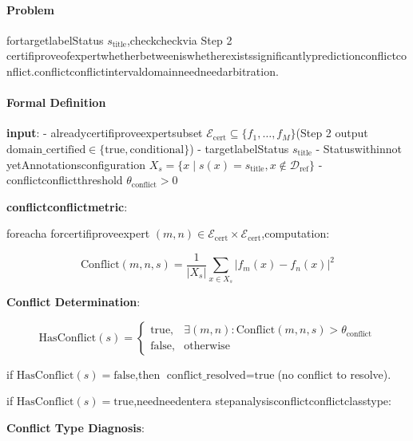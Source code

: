 \documentclass[
  12pt,
]{article}
\begin{document}
\paragraph{Problem}\label{ux95eeux9898-2}

fortargetlabelStatus \(s_{\text{title}}\),checkcheckvia Step 2
certifiproveofexpertwhetherbetweeniswhetherexistssignificantlypredictionconflictconflict.conflictconflictintervaldomainneedneedarbitration.

\paragraph{Formal Definition}\label{ux5f62ux5f0fux5316ux5b9aux4e49-2}

\textbf{input}: - alreadycertifiproveexpertsubset
\(\mathcal{E}_{\text{cert}} \subseteq \{f_1, \dots, f_M\}\)(Step 2 output
\(\text{domain\_certified} \in \{\text{true}, \text{conditional}\}\)) -
targetlabelStatus \(s_{\text{title}}\) - Statuswithinnot yetAnnotationsconfiguration
\(X_s = \{x \mid s(x) = s_{\text{title}}, x \notin \mathcal{D}_{\text{ref}}\}\)
- conflictconflictthreshold \(\theta_{\text{conflict}} > 0\)

\textbf{conflictconflictmetric}:

foreacha forcertifiproveexpert
\((m, n) \in \mathcal{E}_{\text{cert}} \times \mathcal{E}_{\text{cert}}\),computation:

\[\text{Conflict}(m, n, s) = \frac{1}{|X_s|} \sum_{x \in X_s} |f_m(x) - f_n(x)|^2\]

\textbf{Conflict Determination}:

\[\text{HasConflict}(s) = \begin{cases}
\text{true}, & \exists (m, n): \text{Conflict}(m, n, s) > \theta_{\text{conflict}} \\
\text{false}, & \text{otherwise}
\end{cases}\]

if \(\text{HasConflict}(s) = \text{false}\),then
\(\text{conflict\_resolved} = \text{true}\)(no conflict to resolve).

if \(\text{HasConflict}(s) = \text{true}\),needneedentera stepanalysisconflictconflictclasstype:

\textbf{Conflict Type Diagnosis}:
\end{document}
